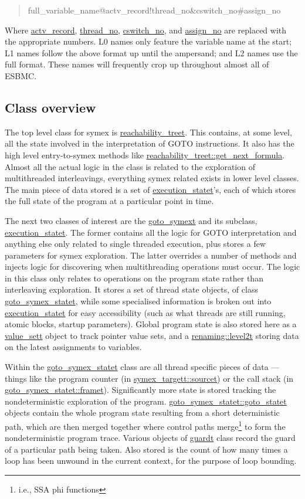 \documentclass{article}
\begin{document}
\begin{quote}
full\_variable\_name@actv\_record!thread\_no\&cswitch\_no\#assign\_no
\end{quote}

Where \url{actv_record}, \url{thread_no}, \url{cswitch_no}, and
\url{assign_no} are replaced with the appropriate numbers. L0 names only
feature the variable name at the start; L1 names follow the above format
up until the ampersand; and L2 names use the full format. These names will
frequently crop up throughout almost all of ESBMC.

\subsection{Class overview}

The top level class for symex is \url{reachability_treet}. This contains,
at some level, all the state involved in the interpretation of GOTO
instructions. It also has the high level entry-to-symex methods like
\url{reachability_treet::get_next_formula}. Almost all the actual
logic in the class is related to the exploration of multithreaded interleavings,
everything symex related exists in lower level classes. The main piece of
data stored is a set of \url{execution_statet}'s, each of which stores
the full state of the program at a particular point in time.

The next two classes of interest are the \url{goto_symext} and its
subclass, \url{execution_statet}. The former contains all the logic
for GOTO interpretation and anything else only related to single threaded
execution, plus stores a few parameters for symex exploration. The latter
overrides a number of methods and injects logic for discovering when
multithreading operations must occur. The logic in this class only relates
to operations on the program state rather than interleaving exploration.
It stores a set of thread state objects, of class
\url{goto_symex_statet}, while some specialised information is broken out
into \url{execution_statet} for easy accessibility (such as what threads
are still running, atomic blocks, startup parameters). Global program state
is also stored here as a \url{value_sett} object to track pointer value
sets, and a \url{renaming::level2t} storing data on the latest assignments
to variables.

Within the \url{goto_symex_statet} class are all thread specific pieces
of data --- things like the program counter (in
\url{symex_targett::sourcet}) or the call stack (in
\url{goto_symex_statet::framet}). Significantly more state is stored
tracking the nondeterministic exploration of the program.
\url{goto_symex_statet::goto_statet} objects contain the whole program
state resulting from a short deterministic path, which are then merged together
where control paths merge\footnote{i.e., SSA phi functions} to form the
nondeterministic program trace. Various objects of \url{guardt} class
record the guard of a particular path being taken. Also stored is the count
of how many times a loop has been unwound in the current context, for the
purpose of loop bounding.
\end{document}
